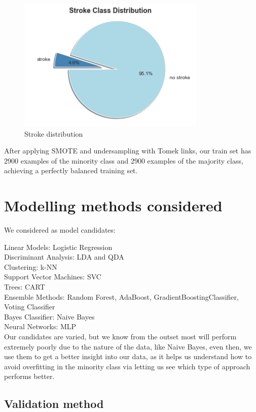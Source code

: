 \documentclass[11pt, a4paper]{article}
\begin{document}
\begin{figure}[H]
    \centering
    \includegraphics[width=0.8\textwidth]{images/Stroke.png}
    \caption{Stroke distribution}
    \label{fig:stroke}
\end{figure}

After applying SMOTE and undersampling with Tomek links, our train set has 2900 examples of the minority class and 2900 examples of the majority class, achieving a perfectly balanced training set. 


\section{Modelling methods considered}

We considered as model candidates:

Linear Models: Logistic Regression \\
Discriminant Analysis: LDA and QDA \\
Clustering: k-NN \\
Support Vector Machines: SVC \\
Trees: CART \\
Ensemble Methods: Random Forest, AdaBoost, GradientBoostingClassifier, Voting Classifier \\
Bayes Classifier: Naive Bayes \\
Neural Networks: MLP \\

Our candidates are varied, but we know from the outset most will perform extremely poorly due to the nature of the data, like Naive Bayes, even then, we use them to get a better insight into our data, as it helps us understand how to avoid overfitting in the minority class via letting us see which type of approach performs better.

\subsection{Validation method}
\end{document}
